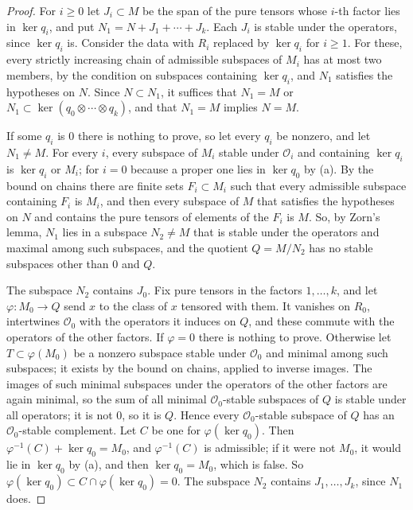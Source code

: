 \begin{proof}
For $i\geq0$ let $J_i\subset M$ be the span of the pure tensors whose $i$-th
factor lies in $\ker q_i$, and put $N_1=N+J_1+\cdots+J_k$. Each $J_i$ is
stable under the operators, since $\ker q_i$ is. Consider the data with $R_i$
replaced by $\ker q_i$ for $i\geq1$. For these, every strictly increasing
chain of admissible subspaces of $M_i$ has at most two members, by the
condition on subspaces containing $\ker q_i$, and $N_1$ satisfies the
hypotheses on $N$. Since $N\subset N_1$, it suffices that $N_1=M$ or
$N_1\subset\ker(q_0\otimes\cdots\otimes q_k)$, and that $N_1=M$ implies
$N=M$.

If some $q_i$ is $0$ there is nothing to prove, so let every $q_i$ be
nonzero, and let $N_1\neq M$. For every $i$, every subspace of $M_i$ stable
under $\mathcal O_i$ and containing $\ker q_i$ is $\ker q_i$ or $M_i$; for
$i=0$ because a proper one lies in $\ker q_0$ by (a). By the bound on chains
there are finite sets $F_i\subset M_i$ such that every admissible subspace
containing $F_i$ is $M_i$, and then every subspace of $M$ that satisfies the
hypotheses on $N$ and contains the pure tensors of elements of the $F_i$ is
$M$. So, by Zorn's lemma, $N_1$ lies in a subspace $N_2\neq M$ that is stable
under the operators and maximal among such subspaces, and the quotient
$Q=M/N_2$ has no stable subspaces other than $0$ and $Q$.

The subspace $N_2$ contains $J_0$. Fix pure tensors in the factors
$1,\ldots,k$, and let $\varphi\colon M_0\to Q$ send $x$ to the class of $x$
tensored with them. It vanishes on $R_0$, intertwines $\mathcal O_0$ with the
operators it induces on $Q$, and these commute with the operators of the other
factors. If $\varphi=0$ there is nothing to prove. Otherwise let
$T\subset\varphi(M_0)$ be a nonzero subspace stable under
$\mathcal O_0$ and minimal among such subspaces; it exists by the bound on
chains, applied to inverse images. The images of such minimal subspaces under
the operators of the other factors are again minimal, so the sum of all
minimal $\mathcal O_0$-stable subspaces of $Q$ is stable under all operators;
it is not $0$, so it is $Q$. Hence every $\mathcal O_0$-stable subspace of $Q$
has an $\mathcal O_0$-stable complement. Let $C$ be one for
$\varphi(\ker q_0)$. Then $\varphi^{-1}(C)+\ker q_0=M_0$, and
$\varphi^{-1}(C)$ is admissible; if it were not $M_0$, it would lie in
$\ker q_0$ by (a), and then $\ker q_0=M_0$, which is false. So
$\varphi(\ker q_0)\subset C\cap\varphi(\ker q_0)=0$. The subspace $N_2$
contains $J_1,\ldots,J_k$, since $N_1$ does.


\end{proof}
